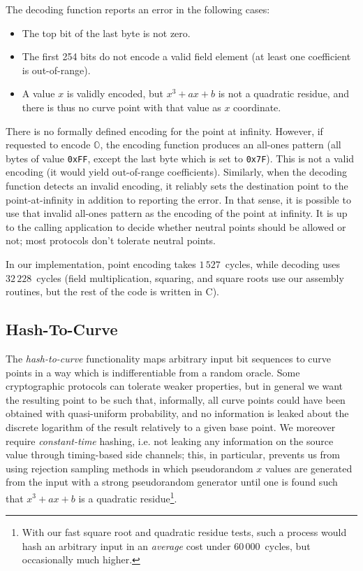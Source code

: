 \documentclass{llncs}
\newcommand{\neutral}{\mathbb{O}}
\begin{document}
The decoding function reports an error in the following cases:
\begin{itemize}

    \item The top bit of the last byte is not zero.

    \item The first 254 bits do not encode a valid field element (at
    least one coefficient is out-of-range).

    \item A value $x$ is validly encoded, but $x^3+ax+b$ is not a
    quadratic residue, and there is thus no curve point with that
    value as $x$ coordinate.

\end{itemize}

There is no formally defined encoding for the point at infinity.
However, if requested to encode $\neutral$, the encoding function
produces an all-ones pattern (all bytes of value \verb+0xFF+, except the
last byte which is set to \verb+0x7F+). This is not a valid encoding (it
would yield out-of-range coefficients). Similarly, when the decoding
function detects an invalid encoding, it reliably sets the destination
point to the point-at-infinity in addition to reporting the error. In
that sense, it is possible to use that invalid all-ones pattern as the
encoding of the point at infinity. It is up to the calling application
to decide whether neutral points should be allowed or not; most
protocols don't tolerate neutral points.

In our implementation, point encoding takes $1\,527$~cycles, while decoding
uses $32\,228$~cycles (field multiplication, squaring, and square roots use
our assembly routines, but the rest of the code is written in C).

\subsection{Hash-To-Curve}

The \emph{hash-to-curve} functionality maps arbitrary input bit
sequences to curve points in a way which is indifferentiable from a
random oracle. Some cryptographic protocols can tolerate weaker
properties, but in general we want the resulting point to be such that,
informally, all curve points could have been obtained with quasi-uniform
probability, and no information is leaked about the discrete logarithm
of the result relatively to a given base point. We moreover require
\emph{constant-time} hashing, i.e. not leaking any information on the
source value through timing-based side channels; this, in particular,
prevents us from using rejection sampling methods in which pseudorandom
$x$ values are generated from the input with a strong pseudorandom
generator until one is found such that $x^3+ax+b$ is a quadratic
residue\footnote{With our fast square root and quadratic residue tests,
such a process would hash an arbitrary input in an \emph{average} cost
under $60\,000$~cycles, but occasionally much higher.}.
\end{document}

